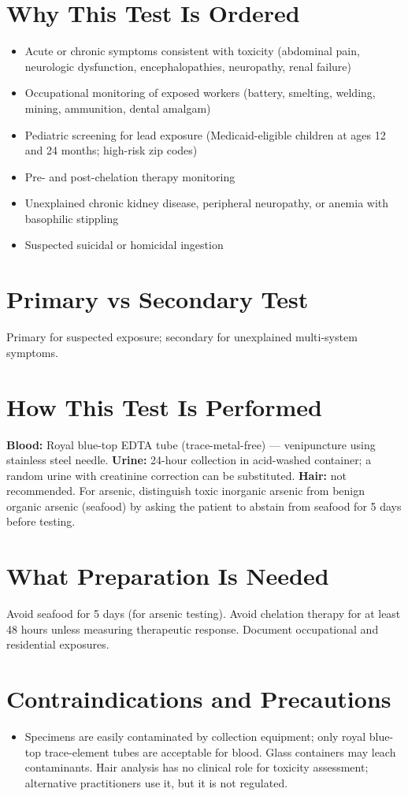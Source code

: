 \section*{Why This Test Is Ordered}
\begin{itemize}
  \item Acute or chronic symptoms consistent with toxicity (abdominal pain, neurologic dysfunction, encephalopathies, neuropathy, renal failure)
  \item Occupational monitoring of exposed workers (battery, smelting, welding, mining, ammunition, dental amalgam)
  \item Pediatric screening for lead exposure (Medicaid-eligible children at ages 12 and 24 months; high-risk zip codes)
  \item Pre- and post-chelation therapy monitoring
  \item Unexplained chronic kidney disease, peripheral neuropathy, or anemia with basophilic stippling
  \item Suspected suicidal or homicidal ingestion
\end{itemize}

\section*{Primary vs Secondary Test}
Primary for suspected exposure; secondary for unexplained multi-system symptoms.

\section*{How This Test Is Performed}
\textbf{Blood:} Royal blue-top EDTA tube (trace-metal-free) --- venipuncture using stainless steel needle. \textbf{Urine:} 24-hour collection in acid-washed container; a random urine with creatinine correction can be substituted. \textbf{Hair:} not recommended. For arsenic, distinguish toxic inorganic arsenic from benign organic arsenic (seafood) by asking the patient to abstain from seafood for 5 days before testing.

\section*{What Preparation Is Needed}
Avoid seafood for 5 days (for arsenic testing). Avoid chelation therapy for at least 48 hours unless measuring therapeutic response. Document occupational and residential exposures.

\section*{Contraindications and Precautions}
\begin{itemize}
  \item Specimens are easily contaminated by collection equipment; only royal blue-top trace-element tubes are acceptable for blood. Glass containers may leach contaminants. Hair analysis has no clinical role for toxicity assessment; alternative practitioners use it, but it is not regulated.
\end{itemize}
